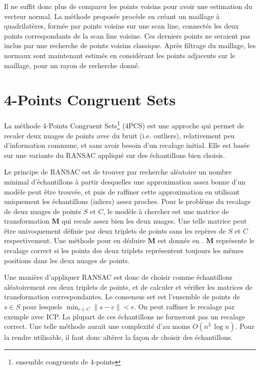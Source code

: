 \documentclass[a4paper,10pt]{scrreprt}
\begin{document}
Il ne suffit donc plus de comparer les points voisins pour avoir une estimation du vecteur normal. La méthode proposée procède en créant un maillage à quadrilatères, formée par points voisins sur une scan line, connectés les deux points correspondants de la scan line voisine. Ces derniers points ne seraient pas inclus par une recherche de points voisins classique. Après filtrage du maillage, les normaux sont maintenant estimés en considérant les points adjacents sur le maillage, pour un rayon de recherche donné.


\section{4-Points Congruent Sets}
La méthode 4-Points Congruent Sets\footnote{ensemble congruents de 4-points} (4PCS) est une approche qui permet de recaler deux nuages de points avec du bruit (i.e. outliers), relativement peu d'information commune, et sans avoir besoin d'un recalage initial. Elle est basée sur une variante du RANSAC appliqué sur des échantillons bien choisis.

Le principe de RANSAC est de trouver par recherche aléatoire un nombre minimal d'échantillons à partir desquelles une approximation assez bonne d'un modèle peut être trouvée, et puis de raffiner cette approximation en utilisant uniquement les échantillons (inliers) assez proches. Pour le problème du recalage de deux nuages de points $S$ et $C$, le modèle à chercher est une matrice de transformation $\mathbf{M}$ qui recale assez bien les deux nuages. Une telle matrice peut être univoquement définie par deux triplets de points sans les repères de $S$ et $C$ respectivement. Une méthode pour en déduire $\mathbf{M}$ est donnée en \cite{Horn1986}. $\mathbf{M}$ représente le recalage correct si les points des deux triplets représentent toujours les mêmes positions dans les deux nuages de points.

Une manière d'appliquer RANSAC est donc de choisir comme échantillons aléatoirement ces deux triplets de points, et de calculer et vérifier les matrices de transformation correspondantes. Le consensus set est l'ensemble de points de $s \in S$ pour lesquels $\min_{c \in C} \| s - c \| < \epsilon$. On peut raffiner le recalage par exemple avec ICP. La plupart de ces échantillons ne formeront pas un recalage correct. Une telle méthode aurait une complexité d'au moins $O(n^3 \, \log n)$. Pour la rendre utilisable, il faut donc altérer la façon de choisir des échantillons.
\end{document}
